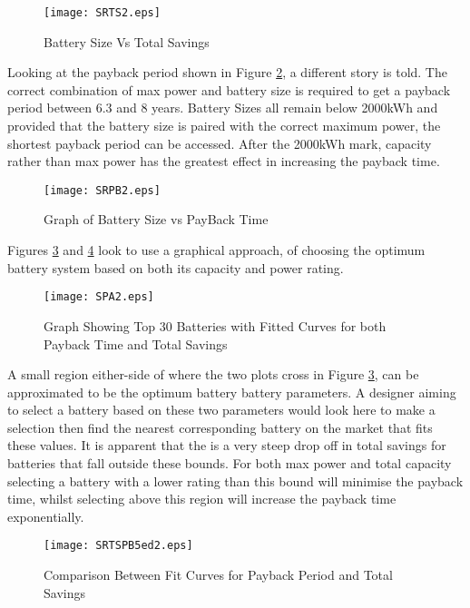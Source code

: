 \begin{figure}[H]
 \centering
 \texttt{[image: SRTS2.eps]}
 \caption{Battery Size Vs Total Savings}
 \label{SRTS2}
\end{figure}

Looking at the payback period shown in Figure \ref{SRPB2}, a different
story is told. The correct combination of max power and battery size is
required to get a payback period between 6.3 and 8 years. Battery Sizes
all remain below 2000kWh and provided that the battery size is paired
with the correct maximum power, the shortest payback period can be
accessed. After the 2000kWh mark, capacity rather than max power has the
greatest effect in increasing the payback time.

\begin{figure}[H]
 \centering
 \texttt{[image: SRPB2.eps]}
 \caption{Graph of Battery Size vs PayBack Time}
 \label{SRPB2}
\end{figure}

Figures \ref{SPA2} and \ref{SRTSPB5} look to use a graphical approach,
of choosing the optimum battery system based on both its capacity and
power rating.

\begin{figure}[H]
\centering
\texttt{[image: SPA2.eps]}
\caption{Graph Showing Top 30 Batteries with Fitted Curves for both Payback Time and Total Savings}
\label{SPA2}
\end{figure}

A small region either-side of where the two plots cross in Figure
\ref{SPA2}, can be approximated to be the optimum battery battery
parameters. A designer aiming to select a battery based on these two
parameters would look here to make a selection then find the nearest
corresponding battery on the market that fits these values. It is
apparent that the is a very steep drop off in total savings for
batteries that fall outside these bounds. For both max power and total
capacity selecting a battery with a lower rating than this bound will
minimise the payback time, whilst selecting above this region will
increase the payback time exponentially.

\begin{figure}[H]
 \centering
 \texttt{[image: SRTSPB5ed2.eps]}
 \caption{Comparison Between Fit Curves for Payback Period and Total Savings}
 \label{SRTSPB5}
 \end{figure}


